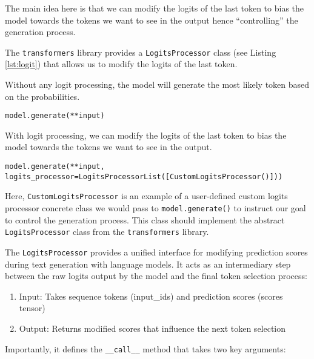 The main idea here is that we can modify the logits of the last token to bias the model towards the tokens we want to see in the output hence ``controlling'' the generation process.

The \texttt{transformers} library provides a \texttt{LogitsProcessor} class (see Listing \ref{lst:logit}) that allows us to modify the logits of the last token.



Without any logit processing, the model will generate the most likely token based on the probabilities.
\begin{verbatim}
model.generate(**input)
\end{verbatim}

With logit processing, we can modify the logits of the last token to bias the model towards the tokens we want to see in the output.
\begin{verbatim}
model.generate(**input, logits_processor=LogitsProcessorList([CustomLogitsProcessor()]))
\end{verbatim}

Here, \texttt{CustomLogitsProcessor} is an example of a user-defined custom logits processor concrete class we would pass to \texttt{model.generate()} to instruct our goal to control the generation process. This class should implement the abstract \texttt{LogitsProcessor} class from the \texttt{transformers} library.

The \texttt{LogitsProcessor} provides a unified interface for modifying prediction scores during text generation with language models. It acts as an intermediary step between the raw logits output by the model and the final token selection process:

\begin{enumerate}
    \item Input: Takes sequence tokens (input\_ids) and prediction scores (scores tensor)
    \item Output: Returns modified scores that influence the next token selection
\end{enumerate}

Importantly, it defines the \texttt{\_\_call\_\_} method that takes two key arguments:

